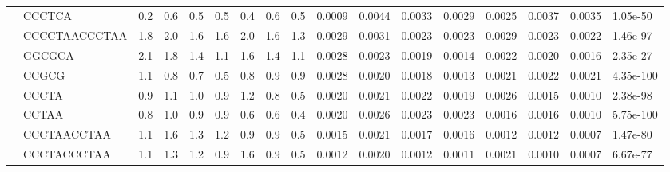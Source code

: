 \begin{landscape}
\begin{samepage}
\begin{table}[h!]
\begin{tabular}{lllllllllllllllll}
\textbf{}    &         CCCTCA &  0.2  &  0.6  &  0.5  &  0.5  &  0.4  &  0.6  &  0.5  &  0.0009 &  0.0044 &  0.0033 &  0.0029 &  0.0025 &  0.0037 &  0.0035 &   1.05e-50 \\
\textbf{}    &  CCCCTAACCCTAA &  1.8  &  2.0  &  1.6  &  1.6  &  2.0  &  1.6  &  1.3  &  0.0029 &  0.0031 &  0.0023 &  0.0023 &  0.0029 &  0.0023 &  0.0022 &   1.46e-97 \\
\textbf{}    &         GGCGCA &  2.1  &  1.8  &  1.4  &  1.1  &  1.6  &  1.4  &  1.1  &  0.0028 &  0.0023 &  0.0019 &  0.0014 &  0.0022 &  0.0020 &  0.0016 &   2.35e-27 \\
\textbf{}    &          CCGCG &  1.1  &  0.8  &  0.7  &  0.5  &  0.8  &  0.9  &  0.9  &  0.0028 &  0.0020 &  0.0018 &  0.0013 &  0.0021 &  0.0022 &  0.0021 &  4.35e-100 \\
\textbf{}    &          CCCTA &  0.9  &  1.1  &  1.0  &  0.9  &  1.2  &  0.8  &  0.5  &  0.0020 &  0.0021 &  0.0022 &  0.0019 &  0.0026 &  0.0015 &  0.0010 &   2.38e-98 \\
\textbf{}    &          CCTAA &  0.8  &  1.0  &  0.9  &  0.9  &  0.6  &  0.6  &  0.4  &  0.0020 &  0.0026 &  0.0023 &  0.0023 &  0.0016 &  0.0016 &  0.0010 &  5.75e-100 \\
\textbf{}    &    CCCTAACCTAA &  1.1  &  1.6  &  1.3  &  1.2  &  0.9  &  0.9  &  0.5  &  0.0015 &  0.0021 &  0.0017 &  0.0016 &  0.0012 &  0.0012 &  0.0007 &   1.47e-80 \\
\textbf{}    &    CCCTACCCTAA &  1.1  &  1.3  &  1.2  &  0.9  &  1.6  &  0.9  &  0.5  &  0.0012 &  0.0020 &  0.0012 &  0.0011 &  0.0021 &  0.0010 &  0.0007 &   6.67e-77 \\
\hline
\end{tabular}
\caption{}
\label{}
\end{table}
\end{samepage}
\end{landscape}

